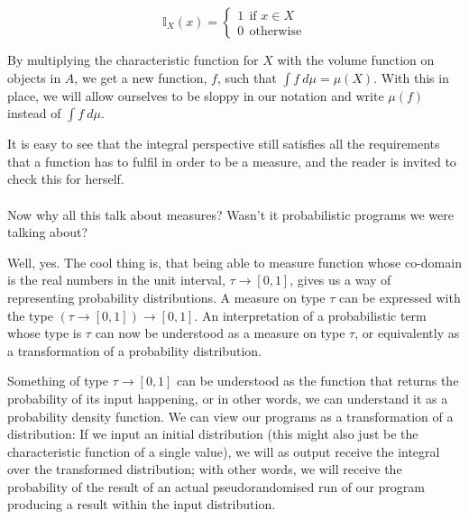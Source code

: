 \documentclass[11pt, leqno, titlepage]{article}
\theoremstyle{definition}
\begin{document}
$$\mathbb{I}_X(x)=
\begin{cases}
  1~~\text{if }x\in X\\
  0~~\text{otherwise}
\end{cases}$$

By multiplying the characteristic function for $X$ with the volume function on
objects in $A$, we get a new function, $f$, such that $\int f~d\mu = \mu(X)$. With
this in place, we will allow ourselves to be sloppy in our notation and write
$\mu(f)$ instead of $\int f~d\mu$.

It is easy to see that the integral perspective still satisfies all the requirements
that a function has to fulfil in order to be a measure, and the reader is invited to
check this for herself.\\
\\
Now why all this talk about measures? Wasn't it probabilistic programs we were
talking about?

Well, yes. The cool thing is, that being able to measure function whose co-domain is
the real numbers in the unit interval, $\tau\to[0,1]$, gives us a way of representing
probability distributions. A measure on type $\tau$ can be expressed with the type
$(\tau\to[0,1])\to[0,1]$. An interpretation of a probabilistic term whose type is
$\tau$ can now be understood as a measure on type $\tau$, or equivalently as a
transformation of a probability distribution.

Something of type $\tau\to[0,1]$ can be understood as the function that returns the
probability of its input happening, or in other words, we can understand it as a
probability density function. We can view our programs as a transformation of a
distribution: If we input an initial distribution (this might also just be the
characteristic function of a single value), we will as output receive the integral
over the transformed distribution; with other words, we will receive the probability
of the result of an actual pseudorandomised run of our program producing a result
within the input distribution.
\end{document}
